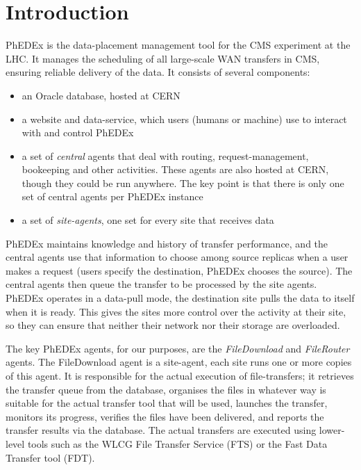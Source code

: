 \section{Introduction}
PhEDEx\cite{PhEDEx} is the data-placement management tool for the CMS\cite{CMS} experiment at the LHC. It manages the scheduling of all large-scale WAN transfers in CMS, ensuring reliable delivery of the data. It consists of several components:

\begin{itemize}
\item an Oracle database, hosted at CERN
\item a website and data-service, which users (humans or machine) use to interact with and control PhEDEx
\item a set of \emph{central} agents that deal with routing, request-management, bookeeping and other activities. These agents are also hosted at CERN, though they could be run anywhere. The key point is that there is only one set of central agents per PhEDEx instance
\item a set of \emph{site-agents}, one set for every site that receives data
\end{itemize}

PhEDEx maintains knowledge and history of transfer performance, and the central agents use that information to choose among source replicas when a user makes a request (users specify the destination, PhEDEx chooses the source). The central agents then queue the transfer to be processed by the site agents. PhEDEx operates in a data-pull mode, the destination site pulls the data to itself when it is ready. This gives the sites more control over the activity at their site, so they can ensure that neither their network nor their storage are overloaded.

The key PhEDEx agents, for our purposes, are the \emph{FileDownload} and \emph{FileRouter} agents. The FileDownload agent is a site-agent, each site runs one or more copies of this agent. It is responsible for the actual execution of file-transfers; it retrieves the transfer queue from the database, organises the files in whatever way is suitable for the actual transfer tool that will be used, launches the transfer, monitors its progress, verifies the files have been delivered, and reports the transfer results via the database. The actual transfers are executed using lower-level tools such as the WLCG File Transfer Service (FTS\cite{FTS}) or the Fast Data Transfer tool (FDT\cite{MonALISA}\cite{FDT}).

